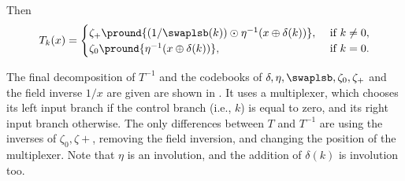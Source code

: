 Then $$
T_k(x) = \begin{cases}
\zeta_+ \pround{
(1/\swaplsb(k)) \odot \eta^{-1} (x \oplus \delta(k))
},&~\text{if}~k\ne 0,\\
\zeta_0\pround {
\eta^{-1} (x \oplus \delta(k))
},&~\text{if}~k = 0.
\end{cases}
$$

The final decomposition of $T^{-1}$ and the codebooks of $\delta, \eta, \swaplsb, \zeta_0, \zeta_+$ and the field inverse $1/x$ are given are shown in . It uses a multiplexer, which chooses its left input branch if the control branch (i.e., $k$) is equal to zero, and its right input branch otherwise.
The only differences between $T$ and $T^{-1}$ are using the inverses of $\zeta_0, \zeta+$, removing the field inversion, and changing the position of the multiplexer. Note that $\eta$ is an involution, and the addition of $\delta(k)$ is involution too. 

